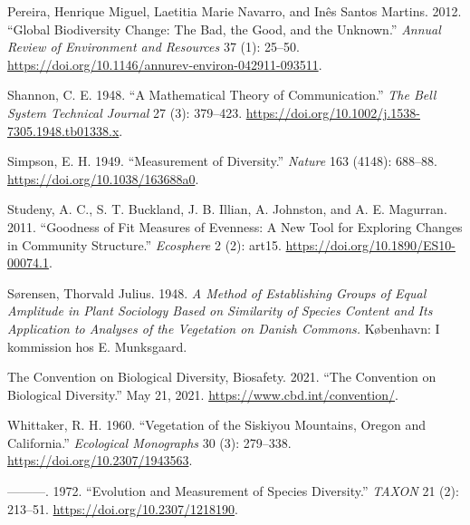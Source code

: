 \documentclass[
  12pt,
  oneside]{report}
\begin{document}
\leavevmode\hypertarget{ref-pereira_global_2012}{}%
Pereira, Henrique Miguel, Laetitia Marie Navarro, and Inês Santos Martins. 2012. ``Global Biodiversity Change: The Bad, the Good, and the Unknown.'' \emph{Annual Review of Environment and Resources} 37 (1): 25--50. \url{https://doi.org/10.1146/annurev-environ-042911-093511}.

\leavevmode\hypertarget{ref-shannon_mathematical_1948}{}%
Shannon, C. E. 1948. ``A Mathematical Theory of Communication.'' \emph{The Bell System Technical Journal} 27 (3): 379--423. \url{https://doi.org/10.1002/j.1538-7305.1948.tb01338.x}.

\leavevmode\hypertarget{ref-simpson_measurement_1949}{}%
Simpson, E. H. 1949. ``Measurement of Diversity.'' \emph{Nature} 163 (4148): 688--88. \url{https://doi.org/10.1038/163688a0}.

\leavevmode\hypertarget{ref-studeny_goodness_2011}{}%
Studeny, A. C., S. T. Buckland, J. B. Illian, A. Johnston, and A. E. Magurran. 2011. ``Goodness of Fit Measures of Evenness: A New Tool for Exploring Changes in Community Structure.'' \emph{Ecosphere} 2 (2): art15. \url{https://doi.org/10.1890/ES10-00074.1}.

\leavevmode\hypertarget{ref-sorensen_method_1948}{}%
Sørensen, Thorvald Julius. 1948. \emph{A Method of Establishing Groups of Equal Amplitude in Plant Sociology Based on Similarity of Species Content and Its Application to Analyses of the Vegetation on Danish Commons.} København: I kommission hos E. Munksgaard.

\leavevmode\hypertarget{ref-the_convention_on_biological_diversity_convention_2021}{}%
The Convention on Biological Diversity, Biosafety. 2021. ``The Convention on Biological Diversity.'' May 21, 2021. \url{https://www.cbd.int/convention/}.

\leavevmode\hypertarget{ref-whittaker_vegetation_1960}{}%
Whittaker, R. H. 1960. ``Vegetation of the Siskiyou Mountains, Oregon and California.'' \emph{Ecological Monographs} 30 (3): 279--338. \url{https://doi.org/10.2307/1943563}.

\leavevmode\hypertarget{ref-whittaker_evolution_1972}{}%
---------. 1972. ``Evolution and Measurement of Species Diversity.'' \emph{TAXON} 21 (2): 213--51. \url{https://doi.org/10.2307/1218190}.
\end{document}
